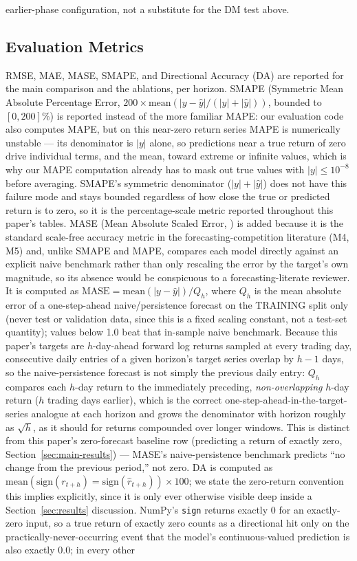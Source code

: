 \documentclass[journal]{IEEEtran}
\begin{document}
earlier-phase configuration, not a substitute for the DM test above.

\subsection{Evaluation Metrics}
\label{sec:eval-metrics}

RMSE, MAE, MASE, SMAPE, and Directional Accuracy (DA) are reported for the main comparison and the ablations, per horizon. SMAPE (Symmetric Mean Absolute Percentage Error, $200\times\text{mean}(|y-\hat y|/(|y|+|\hat y|))$, bounded to $[0,200]\%$) is reported instead of the more familiar MAPE: our evaluation code also computes MAPE, but on this near-zero return series MAPE is numerically unstable --- its denominator is $|y|$ alone, so predictions near a true return of zero drive individual terms, and the mean, toward extreme or infinite values, which is why our MAPE computation already has to mask out true values with $|y|\le10^{-8}$ before averaging. SMAPE's symmetric denominator ($|y|+|\hat y|$) does not have this failure mode and stays bounded regardless of how close the true or predicted return is to zero, so it is the percentage-scale metric reported throughout this paper's tables. MASE (Mean Absolute Scaled Error, \citealp{HyndmanKoehler2006}) is added because it is the standard scale-free accuracy metric in the forecasting-competition literature (M4, M5) and, unlike SMAPE and MAPE, compares each model directly against an explicit naive benchmark rather than only rescaling the error by the target's own magnitude, so its absence would be conspicuous to a forecasting-literate reviewer. It is computed as $\text{MASE}=\text{mean}(|y-\hat y|)/Q_h$, where $Q_h$ is the mean absolute error of a one-step-ahead naive/persistence forecast on the TRAINING split only (never test or validation data, since this is a fixed scaling constant, not a test-set quantity); values below 1.0 beat that in-sample naive benchmark. Because this paper's targets are $h$-day-ahead forward log returns sampled at every trading day, consecutive daily entries of a given horizon's target series overlap by $h-1$ days, so the naive-persistence forecast is not simply the previous daily entry: $Q_h$ compares each $h$-day return to the immediately preceding, \emph{non-overlapping} $h$-day return ($h$ trading days earlier), which is the correct one-step-ahead-in-the-target-series analogue at each horizon and grows the denominator with horizon roughly as $\sqrt h$, as it should for returns compounded over longer windows. This is distinct from this paper's zero-forecast baseline row (predicting a return of exactly zero, Section~\ref{sec:main-results}) --- MASE's naive-persistence benchmark predicts ``no change from the previous period,'' not zero. DA is computed as $\text{mean}(\text{sign}(r_{t+h}) = \text{sign}(\hat r_{t+h})) \times 100$; we state the zero-return convention this implies explicitly, since it is only ever otherwise visible deep inside a Section~\ref{sec:results} discussion. NumPy's \texttt{sign} returns exactly $0$ for an exactly-zero input, so a true return of exactly zero counts as a directional hit only on the practically-never-occurring event that the model's continuous-valued prediction is also exactly $0.0$; in every other 
\end{document}
